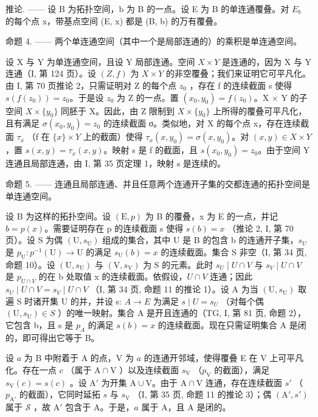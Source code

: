 推论. —— 设 B 为拓扑空间，b 为 B 的一点。设 E 为 B 的单连通覆叠。对 \(E_{b}\) 的每个点 x，带基点空间 (E, x) 都是 (B, b) 的万有覆叠。

命题 4. —— 两个单连通空间（其中一个是局部连通的）的乘积是单连通空间。

设 X 与 Y 为单连通空间，且设 Y 局部连通。空间 \(X \times Y\) 是连通的，因为 X 与 Y 连通（I, 第 124 页）。设 \((Z, f)\) 为 \(X \times Y\) 的非空覆叠；我们来证明它可平凡化。由 I, 第 70 页推论 2，只需证明对 Z 的每个点 \(z_{0}\) ，存在 f 的连续截面 s 使得 \(s(f(z_{0})) = z_{0}\)。于是设 \(z_{0}\) 为 Z 的一点。置 \((x_{0}, y_{0}) = f(z_{0})\)。X × Y 的子空间 \(X \times \{y_{0}\}\) 同胚于 X。因此，由 Z 限制到 \(X \times \{y_{0}\}\) 上所得的覆叠可平凡化，且有满足 \(\sigma(x_{0}, y_{0}) = z_{0}\) 的连续截面 σ。类似地，对 X 的每个点 x，存在连续截面 \(\tau_{x}\) （f 在 \(\{x\} \times Y\) 上的截面）使得 \(\tau_{x}(x, y_{0}) = \sigma(x, y_{0})\)。对 \((x, y) \in X \times Y\) ，置 \(s(x, y) = \tau_{x}(x, y)\)。映射 s 是 f 的截面，且 \(s(x_{0}, y_{0}) = z_{0}\)。由于空间 Y 连通且局部连通，由 I, 第 35 页定理 1，映射 s 是连续的。

命题 5. —— 连通且局部连通、并且任意两个连通开子集的交都连通的拓扑空间是单连通空间。

设 B 为这样的拓扑空间。设 \((\mathrm{E}, p)\) 为 B 的覆叠，x 为 E 的一点，并记 \(b = p(x)\)。需要证明存在 p 的连续截面 s 使得 \(s(b) = x\) （推论 2, I, 第 70 页）。设 S 为偶 \((\mathrm{U}, s_{\mathrm{U}})\) 组成的集合，其中 U 是 B 的包含 b 的连通开子集，\(s_{U}\) 是 \(p_{\mathrm{U}}: p^{-1}(\mathrm{U}) \to \mathrm{U}\) 的满足 \(s_{\mathrm{U}}(b) = x\) 的连续截面。集合 S 非空（I, 第 34 页, 命题 10）。设 \((\mathrm{U}, s_{\mathrm{U}})\) 与 \((\mathrm{V}, s_{\mathrm{V}})\) 为 S 的元素。此时 \(s_{U} \mid U \cap V\) 与 \(s_{V} \mid U \cap V\) 是 \(p_{U \cap V}\) 的在 b 处取值 x 的连续截面。依假设，\(U \cap V\) 连通；因此 \(s_{U} \mid U \cap V = s_{V} \mid U \cap V\) （I, 第 34 页, 命题 11 的推论 1）。设 A 为当 \((\mathrm{U}, s_{\mathrm{U}})\) 取遍 S 时诸开集 U 的并，并设 s: \(A \to E\) 为满足 \(s \mid U = s_{U}\) （对每个偶 \((\mathrm{U}, s_{\mathrm{U}}) \in S\) ）的唯一映射。集合 A 是开且连通的（TG, I, 第 81 页, 命题 2），它包含 b，且 s 是 \(p_{A}\) 的满足 \(s(b) = x\) 的连续截面。现在只需证明集合 A 是闭的，即可得出它等于 B。

设 \(a\) 为 B 中附着于 A 的点，V 为 \(a\) 的连通开邻域，使得覆叠 E 在 V 上可平凡化。存在一点 \(c\) （属于 \(\mathrm{A} \cap \mathrm{V}\) ）以及连续截面 \(s_{\mathrm{V}}\) （\(p_{\mathrm{V}}\) 的截面），满足 \(s_{\mathrm{V}}(c) = s(c)\) 。设 \(\mathrm{A}'\) 为开集 \(\mathrm{A} \cup \mathrm{V}\)。由于 \(\mathrm{A} \cap \mathrm{V}\) 连通，存在连续截面 \(s'\) （\(p_{\mathrm{A}'}\) 的截面），它同时延拓 \(s\) 与 \(s_{\mathrm{V}}\) （I, 第 35 页, 命题 11 的推论 3）；偶 \((\mathrm{A}', s')\) 属于 \(\mathcal{S}\) ，故 \(\mathrm{A}'\) 包含于 A。于是，\(a\) 属于 A，且 A 是闭的。

